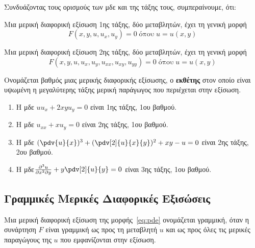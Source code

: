 \begin{rem}
  Συνδυάζοντας τους ορισμούς των μδε και της τάξης τους, συμπεραίνουμε, ότι:
  \begin{myitemize}
    \item Μια μερική διαφορική εξίσωση 1ης τάξης, δύο μεταβλητών, έχει τη γενική μορφή
      \[
        F(x,y,u,u_{x},u_{y}) = 0 \; \text{όπου} \; u=u(x,y)
      \] 
    \item Μια μερική διαφορική εξίσωση 2ης τάξης, δύο μεταβλητών, έχει τη γενική μορφή
      \[
        F(x,y,u,u_{x},u_{y},u_{xx},u_{xy},u_{yy}) = 0 \; \text{όπου} \; u=u(x,y)
      \] 
  \end{myitemize}
\end{rem}

\begin{mybox1}
  \begin{dfn}
    Ονομάζεται \textcolor{Col1}{βαθμός} μιας μερικής διαφορικής εξίσωσης, ο
    \textbf{εκθέτης} στον οποίο είναι υψωμένη η μεγαλύτερης τάξης μερική παράγωγος που 
    περιέχεται στην εξίσωση.
  \end{dfn}
\end{mybox1}

\begin{examples}
\item {}
  \begin{enumerate}
    \item Η μδε $ uu_{x}+2xyu_{y} = 0 $ είναι 1ης τάξης, 1ου βαθμού.
    \item Η μδε $ u_{xx}+xu_{y} = 0 $ είναι 2ης τάξης, 1ου βαθμού.
    \item Η μδε $ (\pdv{u}{x})^{3} + (\pdv[2]{u}{x}{y})^{2} + xy-u=0 $ είναι 2ης τάξης,
      2ου βαθμού.
    \item Η μδε$ \frac{\partial^{3}u}{\partial x^{2}\partial y} + y\pdv[2]{u}{y}=0 $ 
      είναι 3ης τάξης, 1ου βαθμού.
  \end{enumerate}
\end{examples}


\subsection*{Γραμμικές Μερικές Διαφορικές Εξισώσεις}

\begin{mybox1}
  \begin{dfn}
    Μια μερική διαφορική εξίσωση της μορφής~\eqref{eq:pde} ονομάζεται
    \textcolor{Col1}{γραμμική}, όταν η συνάρτηση $F$ είναι γραμμική ως προς τη μεταβλητή 
    $u$ και ως προς όλες τις μερικές παραγώγους της $u$ που εμφανίζονται στην εξίσωση.
  \end{dfn}
\end{mybox1}


